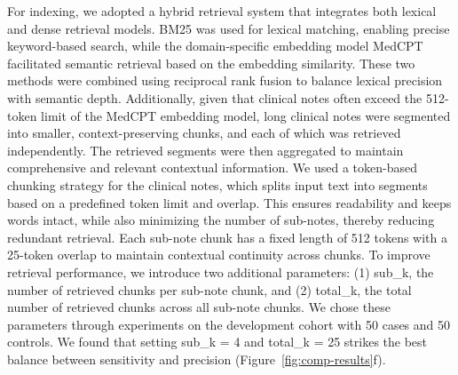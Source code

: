 \documentclass[fleqn,10pt]{wlscirep}
\begin{document}
For indexing, we adopted a hybrid retrieval system that integrates both lexical and dense retrieval models. BM25 was used for lexical matching,\cite{robertson2009probabilistic} enabling precise keyword-based search, while the domain-specific embedding model MedCPT\cite{jin2023medcpt} facilitated semantic retrieval based on the embedding similarity. These two methods were combined using reciprocal rank fusion to balance lexical precision with semantic depth.\cite{cormack2009reciprocal} Additionally, given that clinical notes often exceed the 512-token limit of the MedCPT embedding model, long clinical notes were segmented into smaller, context-preserving chunks, and each of which was retrieved independently. The retrieved segments were then aggregated to maintain comprehensive and relevant contextual information. We used a token-based chunking strategy for the clinical notes, which splits input text into segments based on a predefined token limit and overlap. This ensures readability and keeps words intact, while also minimizing the number of sub-notes, thereby reducing redundant retrieval. Each sub-note chunk has a fixed length of 512 tokens with a 25-token overlap to maintain contextual continuity across chunks. To improve retrieval performance, we introduce two additional parameters: (1) sub\_k, the number of retrieved chunks per sub-note chunk, and (2) total\_k, the total number of retrieved chunks across all sub-note chunks. We chose these parameters through experiments on the development cohort with 50 cases and 50 controls. We found that setting sub\_k = 4 and total\_k = 25 strikes the best balance between sensitivity and precision (Figure~\ref{fig:comp-results}f).


\end{document}
